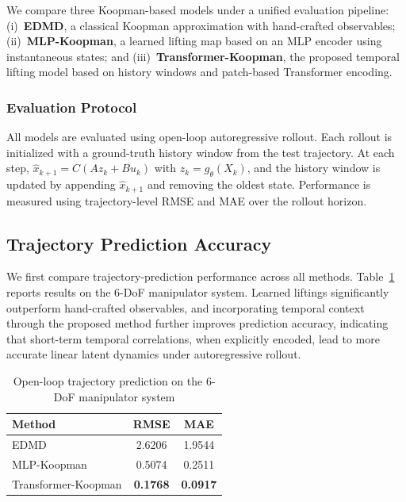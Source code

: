 \documentclass[journal]{IEEEtran}
\begin{document}
We compare three Koopman-based models under a unified evaluation pipeline: (i)~\textbf{EDMD}, a classical Koopman approximation with hand-crafted observables; (ii)~\textbf{MLP-Koopman}, a learned lifting map based on an MLP encoder using instantaneous states; and (iii)~\textbf{Transformer-Koopman}, the proposed temporal lifting model based on history windows and patch-based Transformer encoding.

\subsubsection{Evaluation Protocol}
\label{sec:eval_protocol}

All models are evaluated using open-loop autoregressive rollout. Each rollout is initialized with a ground-truth history window from the test trajectory. At each step, $\hat{x}_{k+1} = C(A z_k + B u_k)$ with $z_k = g_\theta(X_k)$, and the history window is updated by appending $\hat{x}_{k+1}$ and removing the oldest state. Performance is measured using trajectory-level RMSE and MAE over the rollout horizon.

\subsection{Trajectory Prediction Accuracy}

We first compare trajectory-prediction performance across all methods. Table~\ref{tab:prediction_platform_a} reports results on the 6-DoF manipulator system. Learned liftings significantly outperform hand-crafted observables, and incorporating temporal context through the proposed method further improves prediction accuracy, indicating that short-term temporal correlations, when explicitly encoded, lead to more accurate linear latent dynamics under autoregressive rollout.

\begin{table}[!t]
\renewcommand{\arraystretch}{1.2}
\caption{Open-loop trajectory prediction on the 6-DoF manipulator system}
\label{tab:prediction_platform_a}
\centering
\begin{tabular}{lcc}
\toprule
Method & RMSE & MAE \\
\midrule
EDMD & 2.6206 & 1.9544 \\
MLP-Koopman & 0.5074 & 0.2511 \\
Transformer-Koopman & \textbf{0.1768} & \textbf{0.0917} \\
\bottomrule
\end{tabular}
\end{table}
\end{document}
